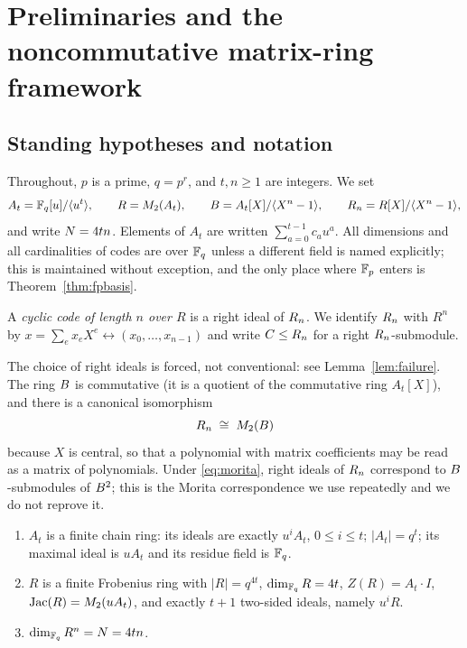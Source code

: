 \section{Preliminaries and the noncommutative matrix-ring framework}
\label{sec:prelim}

\subsection{Standing hypotheses and notation}

Throughout, $p$ is a prime, $q=p^r$, and $t,n\ge1$ are integers. We set
\begin{equation}\label{eq:rings}
  A_t=\mathbb F_q[u]/\langle u^t\rangle,\qquad
  R=M_2(A_t),\qquad
  B=A_t[X]/\langle X^n-1\rangle,\qquad
  R_n=R[X]/\langle X^n-1\rangle ,
\end{equation}
and write $N=4tn$. Elements of $A_t$ are written $\sum_{a=0}^{t-1}c_au^a$.
All dimensions and all cardinalities of codes are over $\mathbb F_q$ unless a different
field is named explicitly; this is maintained without exception, and the only
place where $\mathbb F_p$ enters is Theorem~\ref{thm:fpbasis}.

\begin{definition}\label{def:code}
A \emph{cyclic code of length $n$ over $R$} is a right ideal of $R_n$. We
identify $R_n$ with $R^n$ by $x=\sum_ex_eX^e\leftrightarrow(x_0,\dots,x_{n-1})$
and write $C\le R_n$ for a right $R_n$-submodule.
\end{definition}

The choice of right ideals is forced, not conventional: see
Lemma~\ref{lem:failure}. The ring $B$ is commutative (it is a quotient of the
commutative ring $A_t[X]$), and there is a canonical isomorphism
\begin{equation}\label{eq:morita}
  R_n \;\cong\; M_2(B)
\end{equation}
because $X$ is central, so that a polynomial with matrix coefficients may be
read as a matrix of polynomials. Under \eqref{eq:morita}, right ideals of
$R_n$ correspond to $B$-submodules of $B^2$; this is the Morita
correspondence we use repeatedly and we do not reprove it.

\begin{lemma}\label{lem:basic}
\begin{enumerate}[label=\textnormal{(\alph*)},leftmargin=*]
\item $A_t$ is a finite chain ring: its ideals are exactly
  $u^iA_t$, $0\le i\le t$; $|A_t|=q^t$; its maximal ideal is $uA_t$ and its
  residue field is $\mathbb F_q$.
\item $R$ is a finite Frobenius ring with $|R|=q^{4t}$,
  $\dim_{\mathbb F_q}R=4t$, $Z(R)=A_t\cdot I$, $\operatorname{Jac}(R)=M_2(uA_t)$, and exactly $t+1$
  two-sided ideals, namely $u^iR$.
\item $\dim_{\mathbb F_q}R^n=N=4tn$.
\end{enumerate}
\end{lemma}

